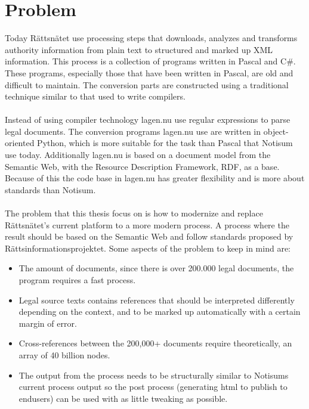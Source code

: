 \section{Problem}
Today Rättsnätet use processing steps that downloads, analyzes and transforms authority information from plain text to structured and marked up XML information. This process is a collection of programs written in Pascal and C\#. These programs, especially those that have been written in Pascal, are old and difficult to maintain. The conversion parts are constructed using a traditional technique similar to that used to write compilers.\\\\
Instead of using compiler technology lagen.nu use regular expressions to parse legal documents. The conversion programs lagen.nu use are written in object-oriented Python, which is more suitable for the task than Pascal that Notisum use today. Additionally lagen.nu is based on a document model from the Semantic Web, with the Resource Description Framework, RDF, as a base. Because of this the code base in lagen.nu has greater flexibility and is more about standards than Notisum.\\\\
The problem that this thesis focus on is how to modernize and replace Rättsnätet's current platform to a more modern process. A process where the result should be based on the Semantic Web and follow standards proposed by Rättsinformationsprojektet. Some aspects of the problem to keep in mind are:
\begin{itemize} 
\item The amount of documents, since there is over 200.000 legal documents, the program requires a fast process.
\item Legal source texts contains references that should be interpreted differently depending on the context, and to be marked up automatically with a certain margin of error.
\item Cross-references between the 200,000+ documents require theoretically, an array of 40 billion nodes.
\item The output from the process needs to be structurally similar to Notisums current process output so the post process (generating html to publish to endusers) can be used with as little tweaking as possible.
\end{itemize}

